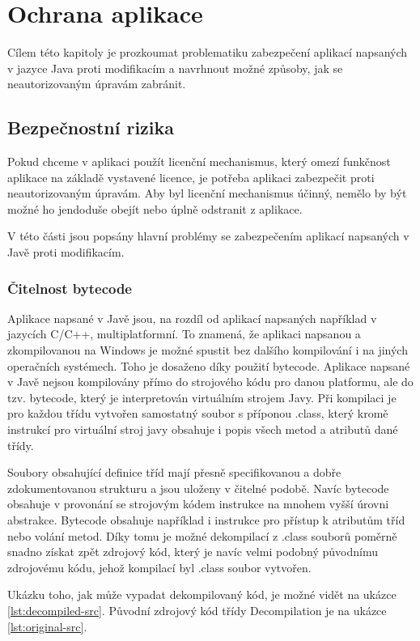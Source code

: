 \chapter{Ochrana aplikace}

Cílem této kapitoly je prozkoumat problematiku zabezpečení aplikací napsaných v
jazyce Java proti modifikacím a navrhnout možné způsoby, jak se neautorizovaným
úpravám zabránit.

\section{Bezpečnostní rizika}

Pokud chceme v aplikaci použít licenční mechanismus, který omezí funkčnost
aplikace na základě vystavené licence, je potřeba aplikaci zabezpečit proti
neautorizovaným úpravám. Aby byl licenční mechanismus účinný, nemělo by být
možné ho jendoduše obejít nebo úplně odstranit z aplikace.

V této části jsou popsány hlavní problémy se zabezpečením aplikací napsaných v
Javě proti modifikacím.

\subsection{Čitelnost bytecode}

Aplikace napsané v Javě jsou, na rozdíl od aplikací napsaných například v
jazycích C/C++, multiplatformní. To znamená, že aplikaci napsanou a
zkompilovanou na Windows je možné spustit bez dalšího kompilování i na jiných
operačních systémech. Toho je dosaženo díky použití bytecode. Aplikace napsané v
Javě nejsou kompilovány přímo do strojového kódu pro danou platformu, ale do
tzv. bytecode, který je interpretován virtuálním strojem Javy. Při kompilaci je
pro každou třídu vytvořen samostatný soubor s příponou .class, který kromě
instrukcí pro virtuální stroj javy obsahuje i popis všech metod a atributů dané
třídy.

Soubory obsahující definice tříd mají přesně specifikovanou a dobře
zdokumentovanou strukturu a jsou uloženy v čitelné podobě. Navíc bytecode
obsahuje v provonání se strojovým kódem instrukce na mnohem vyšší úrovni
abstrakce. Bytecode obsahuje například i instrukce pro přístup k atributům tříd
nebo volání metod. Díky tomu je možné dekompilací z .class souborů poměrně
snadno získat zpět zdrojový kód, který je navíc velmi podobný původnímu
zdrojovému kódu, jehož kompilací byl .class soubor vytvořen.

Ukázku toho, jak může vypadat dekompilovaný kód, je možné vidět na ukázce
\ref{lst:decompiled-src}. Původní zdrojový kód třídy Decompilation je na ukázce
\ref{lst:original-src}.

